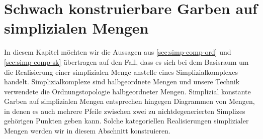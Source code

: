 
\chapter{Schwach konstruierbare Garben auf simplizialen Mengen}
\label{ch:simp-set-sk}

In diesem Kapitel möchten wir die Aussagen aus
\autoref{sec:simp-comp-ord} und \autoref{sec:simp-comp-sk} übertragen
auf den Fall, dass es sich bei dem Basisraum um die Realisierung einer
simplizialen Menge anstelle eines Simplizialkomplexes
handelt. Simplizialkomplexe sind halbgeordnete Mengen und unsere
Technik verwendete die Ordnungstopologie halbgeordneter
Mengen. Simplizial konstante Garben auf simplizialen Mengen
entsprechen hingegen Diagrammen von Mengen, in denen es auch mehrere
Pfeile zwischen zwei zu nichtdegenerierten Simplizes gehörigen Punkten
geben kann. Solche kategoriellen Realisierungen simplizialer Mengen
werden wir in diesem Abschnitt konstruieren.

